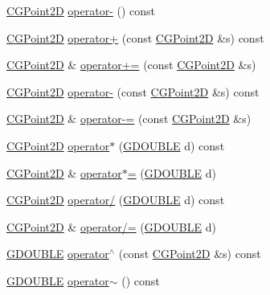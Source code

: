 \begin{DoxyCompactItemize}
\item 
\hyperlink{class_c_g_point2_d}{C\+G\+Point2\+D} \hyperlink{class_c_g_point2_d_a3f8051e2280e08f494f03248e22c8040}{operator-\/} () const 
\item 
\hyperlink{class_c_g_point2_d}{C\+G\+Point2\+D} \hyperlink{class_c_g_point2_d_a5509bc6897185911b12bfe172a2d0be1}{operator+} (const \hyperlink{class_c_g_point2_d}{C\+G\+Point2\+D} \&s) const 
\item 
\hyperlink{class_c_g_point2_d}{C\+G\+Point2\+D} \& \hyperlink{class_c_g_point2_d_ac16f33c75ce76a7ea47c2b0de67c1147}{operator+=} (const \hyperlink{class_c_g_point2_d}{C\+G\+Point2\+D} \&s)
\item 
\hyperlink{class_c_g_point2_d}{C\+G\+Point2\+D} \hyperlink{class_c_g_point2_d_a779ef3ad2d6d05541cfa9c0095a37165}{operator-\/} (const \hyperlink{class_c_g_point2_d}{C\+G\+Point2\+D} \&s) const 
\item 
\hyperlink{class_c_g_point2_d}{C\+G\+Point2\+D} \& \hyperlink{class_c_g_point2_d_a4620c940b264a4ca6c1f61c0e185ca9c}{operator-\/=} (const \hyperlink{class_c_g_point2_d}{C\+G\+Point2\+D} \&s)
\item 
\hyperlink{class_c_g_point2_d}{C\+G\+Point2\+D} \hyperlink{class_c_g_point2_d_a8d83d3a59da562ade5b875f832e3654a}{operator$\ast$} (\hyperlink{_g_types_8h_afd05ac85f90ee8e2a733928545462cd4}{G\+D\+O\+U\+B\+L\+E} d) const 
\item 
\hyperlink{class_c_g_point2_d}{C\+G\+Point2\+D} \& \hyperlink{class_c_g_point2_d_ae7533077b430967e9cfb9fb39671af5f}{operator$\ast$=} (\hyperlink{_g_types_8h_afd05ac85f90ee8e2a733928545462cd4}{G\+D\+O\+U\+B\+L\+E} d)
\item 
\hyperlink{class_c_g_point2_d}{C\+G\+Point2\+D} \hyperlink{class_c_g_point2_d_a3c485d268c32b5792d6083fa1e4b8a01}{operator/} (\hyperlink{_g_types_8h_afd05ac85f90ee8e2a733928545462cd4}{G\+D\+O\+U\+B\+L\+E} d) const 
\item 
\hyperlink{class_c_g_point2_d}{C\+G\+Point2\+D} \& \hyperlink{class_c_g_point2_d_a0c4de9251eb54e558bf3261c35e992de}{operator/=} (\hyperlink{_g_types_8h_afd05ac85f90ee8e2a733928545462cd4}{G\+D\+O\+U\+B\+L\+E} d)
\item 
\hyperlink{_g_types_8h_afd05ac85f90ee8e2a733928545462cd4}{G\+D\+O\+U\+B\+L\+E} \hyperlink{class_c_g_point2_d_ac191a33734adc16bbba09e04e5cb87c0}{operator$^\wedge$} (const \hyperlink{class_c_g_point2_d}{C\+G\+Point2\+D} \&s) const 
\item 
\hyperlink{_g_types_8h_afd05ac85f90ee8e2a733928545462cd4}{G\+D\+O\+U\+B\+L\+E} \hyperlink{class_c_g_point2_d_a0ea3cf563eb218b5871bc1c9dc11dfbd}{operator$\sim$} () const 

\end{DoxyCompactItemize}
